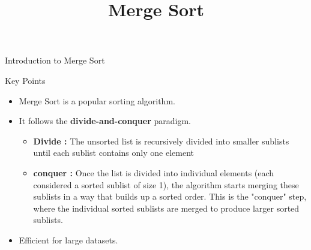 \documentclass{beamer}
\begin{document}
\title{Merge Sort}
\author{}
\date{}




\begin{frame}
  \titlepage
\end{frame}



\begin{frame}{Introduction to Merge Sort}
  \begin{block}{Key Points}
    \begin{itemize}
      \item Merge Sort is a popular sorting algorithm.
      \item It follows the \textbf{divide-and-conquer} paradigm.
            \begin{itemize}
              \item \textbf{Divide :} The unsorted list is recursively divided into smaller sublists until each sublist contains only one element
              \item \textbf{conquer :} Once the list is divided into individual elements (each considered a sorted sublist of size 1), the algorithm starts merging these sublists in a way that builds up a sorted order. This is the "conquer" step, where the individual sorted sublists are merged to produce larger sorted sublists.
            \end{itemize}
      \item Efficient for large datasets.
    \end{itemize}
  \end{block}
\end{frame}
\end{document}
